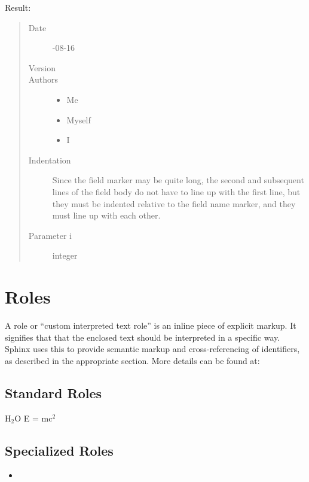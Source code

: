 \documentclass[letterpaper,12pt,english]{sphinxmanual}
\begin{document}
Result:
\begin{quote}\begin{description}
\item[{Date}] -08-16

\item[{Version}] 

\item[{Authors}] \leavevmode\begin{itemize}
\item {} 
Me

\item {} 
Myself

\item {} 
I

\end{itemize}

\item[{Indentation}] \leavevmode
Since the field marker may be quite long, the second
and subsequent lines of the field body do not have to line up
with the first line, but they must be indented relative to the
field name marker, and they must line up with each other.

\item[{Parameter i}] \leavevmode
integer

\end{description}\end{quote}


\section{Roles}
\label{\detokenize{rtxt:roles}}
A role or “custom interpreted text role” is an inline piece of explicit markup. It signifies that that the enclosed text should be interpreted in a specific way. Sphinx uses this to provide semantic markup and cross-referencing of identifiers, as described in the appropriate section. More details can be found at: 


\subsection{Standard Roles}
\label{\detokenize{rtxt:standard-roles}}
H$_{\text{2}}$O
E = mc$^{\text{2}}$


\subsection{Specialized Roles}
\label{\detokenize{rtxt:specialized-roles}}\begin{itemize}
\item {} 

\end{itemize}
\end{document}
